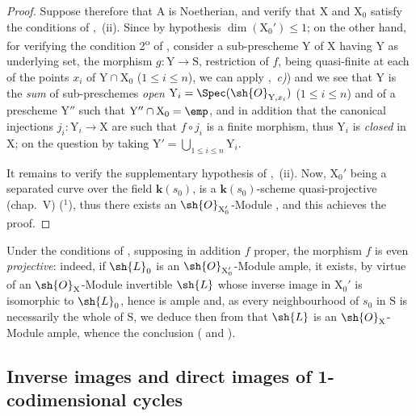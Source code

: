 \begin{proof}
Suppose therefore that $\mathrm{A}$ is Noetherian, and verify that $\mathrm{X}$ and $\mathrm{X}_0$ satisfy the conditions of ,{}~(ii).
Since by hypothesis $\dim(\mathrm{X}_0')\leq 1$;
on the other hand, for verifying the condition 2\textsuperscript{o} of , consider a sub-prescheme $\mathrm{Y}$ of $\mathrm{X}$ having $\mathrm{Y}$ as underlying set, the morphism $g:\mathrm{Y}\to\mathrm{S}$, restriction of $f$, being quasi-finite at each of the points $x_i$ of $\mathrm{Y}\cap\mathrm{X}_0$ ($1\leq i\leq n$), we can apply ,{}~\emph{c)}) and we see that $\mathrm{Y}$ is the \emph{sum} of sub-preschemes \emph{open} $\mathrm{Y}_i=\Spec(\sh{O}_{\mathrm{Y},x_i})$ ($1\leq i\leq n$) and of a prescheme $\mathrm{Y}''$ such that $\mathrm{Y}''\cap\mathrm{X}_0=\emp$, and in addition that the canonical injections $j_i:\mathrm{Y}_i\to\mathrm{X}$ are such that $f\circ j_i$ is a finite morphism, thus $\mathrm{Y}_i$ is \emph{closed} in $\mathrm{X}$;
on the question by taking $\mathrm{Y}'=\bigcup_{1\leq i\leq n}\mathrm{Y}_i$.

It remains to verify the supplementary hypothesis of ,{}~(ii).
Now, $\mathrm{X}_0'$ being a separated curve over the field $\boldsymbol{k}(s_0)$, is a $\boldsymbol{k}(s_0)$-scheme quasi-projective (chap.~V) ($^1$), thus there exists an $\sh{O}_{\mathrm{X}'_0}$-Module , and this achieves the proof.
\end{proof}

\begin{remark}[21.9.13]
\label{IV.21.9.13}
Under the conditions of , supposing in addition $f$ proper, the morphism $f$ is even \emph{projective}:
indeed, if $\sh{L}_0$ is an $\sh{O}_{\mathrm{X}'_0}$-Module ample, it exists, by virtue of  an $\sh{O}_\mathrm{X}$-Module invertible $\sh{L}$ whose inverse image in $\mathrm{X}_0'$ is isomorphic to $\sh{L}_0$, hence is ample and, as every neighbourhood of $s_0$ in $\mathrm{S}$ is necessarily the whole of $\mathrm{S}$, we deduce then from  that $\sh{L}$ is an $\sh{O}_\mathrm{X}$-Module ample, whence the conclusion ( and ).
\end{remark}
\subsection{Inverse images and direct images of 1-codimensional cycles}
\label{subsection:IV.21.10}

